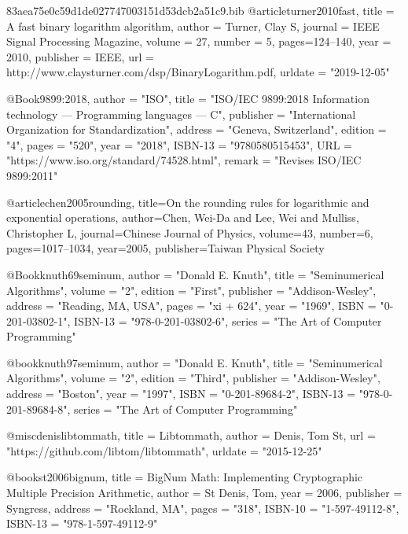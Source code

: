 \begin{filecontents}{83aea75e0c59d1de027747003151d53dcb2a51c9.bib}
@article{turner2010fast,
  title = {A fast binary logarithm algorithm},
  author = {Turner, Clay S},
  journal = {IEEE Signal Processing Magazine},
  volume = {27},
  number = {5},
  pages={124--140},
  year = {2010},
  publisher = {IEEE},
  url = {http://www.claysturner.com/dsp/BinaryLogarithm.pdf},
  urldate = "2019-12-05"
}

@Book{9899:2018,
  author =       "{ISO}",
  title =        "{ISO\slash IEC 9899:2018 Information technology ---
                 Programming languages --- C}",
  publisher =    "International Organization for Standardization",
  address =      "Geneva, Switzerland",
  edition =      "4",
  pages =        "520",
  year =         "2018",
  ISBN-13 =      "9780580515453",
  URL =          "https://www.iso.org/standard/74528.html",
  remark =       "Revises ISO/IEC 9899:2011"
}

@article{chen2005rounding,
  title={On the rounding rules for logarithmic and exponential operations},
  author={Chen, Wei-Da and Lee, Wei and Mulliss, Christopher L},
  journal={Chinese Journal of Physics},
  volume={43},
  number={6},
  pages={1017--1034},
  year={2005},
  publisher={Taiwan Physical Society}
}

@Book{knuth69seminum,
  author    = "Donald E. Knuth",
  title     = "Seminumerical Algorithms",
  volume    = "2",
  edition   = "First",
  publisher = "Addison-Wesley",
  address   = "Reading, MA, USA",
  pages     = "xi + 624",
  year      = "1969",
  ISBN      = "0-201-03802-1",
  ISBN-13   = "978-0-201-03802-6",
  series    = "The Art of Computer Programming"
}

@book{knuth97seminum,
  author    = "Donald E. Knuth",
  title     = "Seminumerical Algorithms",
  volume    = "2",
  edition   = "Third",
  publisher = "Addison-Wesley",
  address   = "Boston",
  year      = "1997",
  ISBN      = "0-201-89684-2",
  ISBN-13   = "978-0-201-89684-8",
  series    = "The Art of Computer Programming"
}

@misc{denislibtommath,
  title     = {Libtommath},
  author    = {Denis, Tom St},
  url       = "https://github.com/libtom/libtommath",
  urldate   = "2015-12-25"
}

@book{st2006bignum,
  title     = {BigNum Math: Implementing Cryptographic Multiple Precision Arithmetic},
  author    = {St Denis, Tom},
  year      = {2006},
  publisher = {Syngress},
  address   = "Rockland, MA",
  pages     = "318",
  ISBN-10   = "1-597-49112-8",
  ISBN-13   = "978-1-597-49112-9"
}



\end{filecontents}
